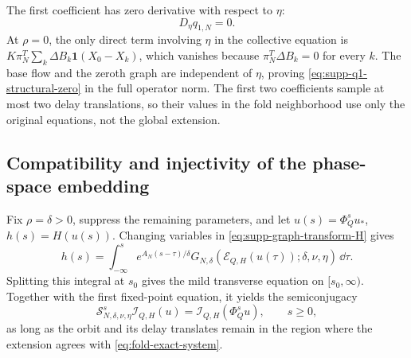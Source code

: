 The first coefficient has zero derivative with respect to \(\eta\):
\begin{equation}
 D_\eta q_{1,N}=0.
 \label{eq:supp-q1-structural-zero}
\end{equation}
At \(\rho=0\), the only direct term involving \(\eta\) in the collective equation
is
\(K\pi_N^T\sum_k\Delta B_k\mathbf1(X_0-X_k)\), which vanishes because
\(\pi_N^T\Delta B_k=0\) for every \(k\).  The base flow and the zeroth graph are
independent of \(\eta\), proving \eqref{eq:supp-q1-structural-zero} in the
full operator norm.  The first two coefficients sample at most two delay
translations, so their values in the fold neighborhood use only the original
equations, not the global extension.

\subsection{Compatibility and injectivity of the phase-space embedding}

Fix \(\rho=\delta>0\), suppress the remaining parameters, and let
\(u(s)=\Phi_Q^su_*\), \(h(s)=H(u(s))\).  Changing variables in
\eqref{eq:supp-graph-transform-H} gives
\begin{equation}
 h(s)=\int_{-\infty}^s
 e^{A_N(s-\tau)/\delta}
 G_{N,\delta}(\mathcal E_{Q,H}(u(\tau));\delta,\nu,\eta)
 \,\dd\tau.
 \label{eq:supp-complete-convolution}
\end{equation}
Splitting this integral at \(s_0\) gives the mild transverse equation on
\([s_0,\infty)\).  Together with the first fixed-point equation, it yields
the semiconjugacy
\begin{equation}
 \mathcal S_{N,\delta,\nu,\eta}^s\mathcal I_{Q,H}(u)
 =\mathcal I_{Q,H}(\Phi_Q^su),\qquad s\ge0,
 \label{eq:supp-semiconjugacy}
\end{equation}
as long as the orbit and its delay translates remain in the region where
the extension agrees with \cref{eq:fold-exact-system}.

